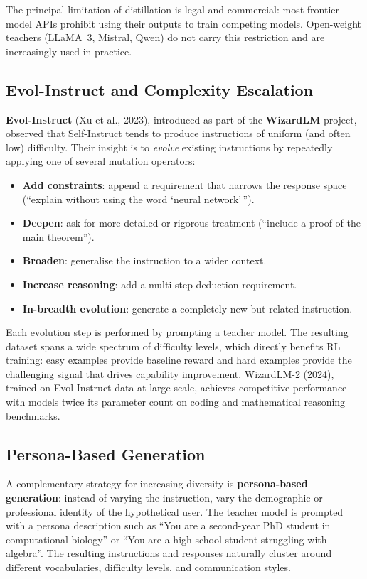 The principal limitation of distillation is legal and commercial: most frontier model APIs prohibit using their outputs to train competing models. Open-weight teachers (LLaMA~3, Mistral, Qwen) do not carry this restriction and are increasingly used in practice.

\subsection{Evol-Instruct and Complexity Escalation}

\textbf{Evol-Instruct} (Xu et al., 2023), introduced as part of the \textbf{WizardLM} project, observed that Self-Instruct tends to produce instructions of uniform (and often low) difficulty. Their insight is to \emph{evolve} existing instructions by repeatedly applying one of several mutation operators:

\begin{itemize}[leftmargin=*]
  \item \textbf{Add constraints}: append a requirement that narrows the response space (``explain without using the word `neural network'\,'').
  \item \textbf{Deepen}: ask for more detailed or rigorous treatment (``include a proof of the main theorem'').
  \item \textbf{Broaden}: generalise the instruction to a wider context.
  \item \textbf{Increase reasoning}: add a multi-step deduction requirement.
  \item \textbf{In-breadth evolution}: generate a completely new but related instruction.
\end{itemize}

Each evolution step is performed by prompting a teacher model. The resulting dataset spans a wide spectrum of difficulty levels, which directly benefits RL training: easy examples provide baseline reward and hard examples provide the challenging signal that drives capability improvement. WizardLM-2 (2024), trained on Evol-Instruct data at large scale, achieves competitive performance with models twice its parameter count on coding and mathematical reasoning benchmarks.

\subsection{Persona-Based Generation}

A complementary strategy for increasing diversity is \textbf{persona-based generation}: instead of varying the instruction, vary the demographic or professional identity of the hypothetical user. The teacher model is prompted with a persona description such as ``You are a second-year PhD student in computational biology'' or ``You are a high-school student struggling with algebra''. The resulting instructions and responses naturally cluster around different vocabularies, difficulty levels, and communication styles.

